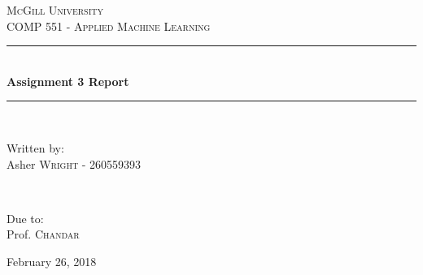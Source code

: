 \documentclass[11pt]{article}
\begin{document}
\begin{titlepage} %
	\newcommand{\HRule}{\rule{\linewidth}{0.5mm}} %
	
	\center %
	
	
	\textsc{\LARGE McGill University}\\[1.5cm] %

	\textsc{\large COMP 551 - Applied Machine Learning}\\[0.5cm] %
	
	
	\HRule\\[0.4cm]
	
	{\huge\bfseries Assignment 3 Report}\\[0.4cm] %
	
	\HRule\\[1.5cm]
	
	
	\begin{minipage}{0.5\textwidth}
		\begin{flushleft}
			\large
			Written by:\\
			Asher \textsc{Wright} - {\small 260559393}
		\end{flushleft}
	\end{minipage}
	~
	\begin{minipage}{0.4\textwidth}
		\begin{flushright}
			\large
			Due to:\\
			Prof.  \textsc{Chandar} 
		\end{flushright}
	\end{minipage}
	

	
	
	\vfill\vfill\vfill %
	
	{\large February 26, 2018} 
	
	\vfill %
\end{titlepage}
\end{document}
